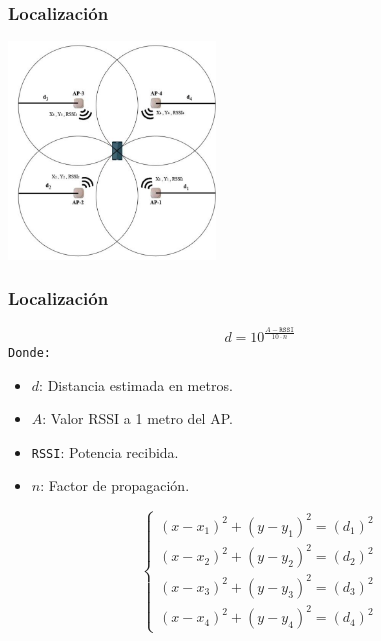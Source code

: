 \documentclass{beamer}
\begin{document}
\begin{frame}
\frametitle{Localización}
\centering
\begin{minipage}{0.45\textwidth}
    \centering
    \includegraphics[width=5.5cm]{figs/trilateration.png}
\end{minipage}


\end{frame}


\begin{frame}
\frametitle{Localización}
\centering

\begin{equation}
d = 10^{\frac{A - \texttt{RSSI}}{10 \cdot n}}
\label{ec:ec2}
\end{equation}
\texttt{Donde:}
\begin{itemize}
    \item $d$: Distancia estimada en metros.
    \item $A$: Valor RSSI a 1 metro del AP.
    \item \texttt{RSSI}: Potencia recibida.
    \item $n$: Factor de propagación.
\end{itemize}
\vspace{0.3cm} %
\begin{equation}
\left\{
	\begin{array}{lcc}
		(x - x_1)^2 + (y - y_1)^2 = (d_1)^2\\
		(x - x_2)^2 + (y - y_2)^2 = (d_2)^2\\
		(x - x_3)^2 + (y - y_3)^2 = (d_3)^2 \\
		(x - x_4)^2 + (y - y_4)^2 = (d_4)^2
	\end{array}
\right.
\label{ec:ec5}
\end{equation}

\end{frame}
\end{document}
